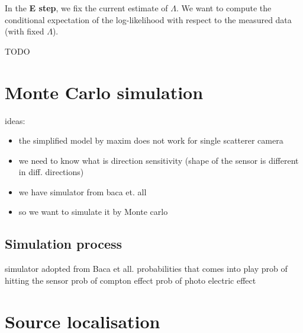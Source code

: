 In the \textbf{E step}, we fix the current estimate of $\Lambda$. 
We want to compute the conditional expectation of the log-likelihood with respect to the measured data (with fixed $\Lambda$).

TODO




\section{Monte Carlo simulation}


ideas:
\begin{itemize}
  \item the simplified model by maxim does not work for single scatterer camera
  \item we need to know what is direction sensitivity (shape of the sensor is different in diff. directions)
  \item we have simulator from baca et. all
  \item so we want to simulate it by Monte carlo
\end{itemize}

\subsection{Simulation process}

simulator adopted from Baca et all.
probabilities that comes into play
prob of hitting the sensor
prob of compton effect
prob of photo electric effect

\section{Source localisation}

